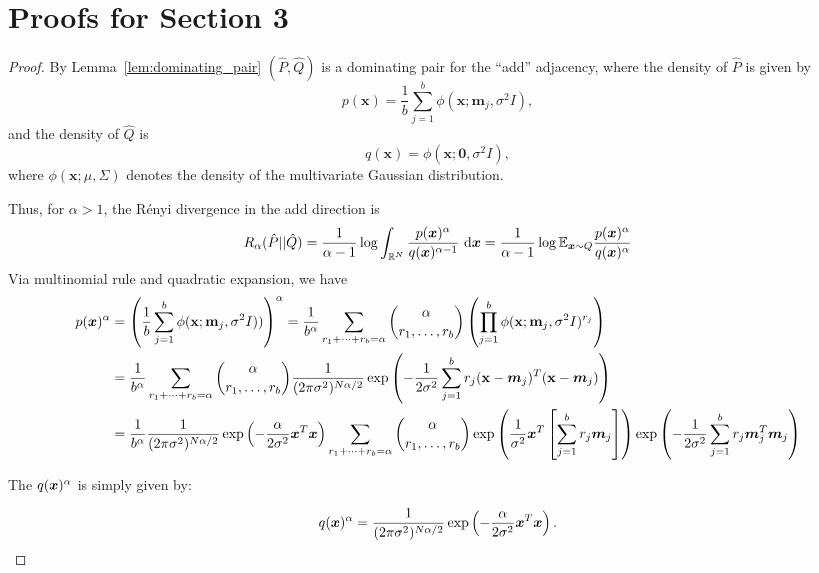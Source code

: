 \documentclass{article}
\theoremstyle{plain}
\theoremstyle{definition}
\theoremstyle{remark}
\begin{document}
\clearpage

\section{Proofs for Section 3}
\RenyiDivergenceBound*
\begin{proof}

By Lemma~\ref{lem:dominating_pair} $(\hat{P},\hat{Q})$ is a dominating pair for the ``add'' adjacency, where the density of $\hat{P}$ is given by
\[
p(\mathbf{x}) = \frac{1}{b}\sum_{j=1}^{b} \phi(\mathbf{x}; \mathbf{m}_j, \sigma^2 I),
\]
and the density of $\hat{Q}$ is
\[
q(\mathbf{x}) = \phi(\mathbf{x}; \mathbf{0}, \sigma^2 I),
\]
where $\phi(\mathbf{x}; \mu, \Sigma)$ denotes the density of the multivariate Gaussian distribution.

Thus, for $\alpha>1$, the Rényi divergence in the add direction is
\begin{equation}
    R_\alpha(\hat{P} || \hat{Q}) = \frac{1}{\alpha - 1} \log
    \int_{{\mathbb{R}}^N} \frac{p({\bm{x}})^\alpha}{q({\bm{x}})^{\alpha-1}} \ \mathrm{d} {\bm{x}} = \frac{1}{\alpha - 1} \log\mathbb{E}_{{\bm{x}} \sim Q}\frac{p({\bm{x}})^\alpha}{q({\bm{x}})^{\alpha}}
\end{equation}
Via multinomial rule and quadratic expansion, we have
\begin{align*}
     p({\bm{x}})^\alpha &= \left(
        \frac{1}{b}\sum_{j=1}^{b} \phi(\mathbf{x}; \mathbf{m}_j, \sigma^2 I))
    \right)^\alpha
    =
    \frac{1}{b^\alpha}
    \sum_{r_1 + \cdots + r_b = \alpha}
    \binom{\alpha}{r_1,\dots,r_b} 
    \left(\prod_{j=1}^b \phi(\mathbf{x}; \mathbf{m}_j, \sigma^2 I)^{r_j}
    \right)
    \\
    &=  \frac{1}{b^\alpha}
    \sum_{r_1 + \cdots + r_b = \alpha}
    \binom{\alpha}{r_1,\dots,r_b} \frac{1}{(2\pi\sigma^2)^{N\alpha / 2}}\exp\left(-\frac{1}{2\sigma^2}\sum\limits_{j = 1}^{b}r_j (\mathbf{x} - {\bm{m}}_j )^T(\mathbf{x} - {\bm{m}}_j)\right)
    \\
    &=
    \frac{1}{b^\alpha}\frac{1}{(2\pi\sigma^2)^{N\alpha / 2}}\exp\left(
        -\frac{\alpha}{2 \sigma^2} {\bm{x}}^T {\bm{x}}
    \right)
    \sum_{r_1 + \cdots + r_b = \alpha}
    \binom{\alpha}{r_1,\dots,r_b}
    \exp\left(
         \frac{1}{\sigma^2} {\bm{x}}^T \left[\sum\limits_{j = 1}^{b} r_j {\bm{m}}_j\right]
    \right)\exp \left(-\frac{1}{2\sigma^2}\sum\limits_{j = 1}^{b}r_j{\bm{m}}_j^T{\bm{m}}_j\right)
\end{align*}

The $q({\bm{x}})^\alpha$ is simply given by:

\begin{equation*}
    q({\bm{x}})^\alpha = \frac{1}{(2\pi\sigma^2)^{N\alpha / 2}}\exp\left(
        -\frac{\alpha}{2 \sigma^2} {\bm{x}}^T {\bm{x}}
    \right).
\end{equation*}


\end{proof}
\end{document}
